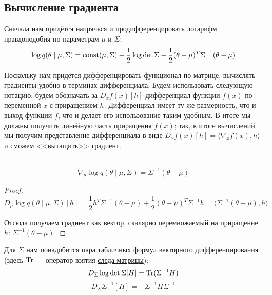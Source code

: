 \subsection{Вычисление градиента}\label{cmaeslikelihoodgrads}

Сначала нам придётся напрячься и продифференцировать логарифм правдоподобия по параметрам $\mu$ и $\Sigma$:
$$\log q(\theta \mid \mu, \Sigma) = \operatorname{const}(\mu, \Sigma) - \frac{1}{2} \log \det \Sigma - \frac{1}{2}(\theta - \mu)^T\Sigma^{-1}(\theta - \mu)$$

Поскольку нам придётся дифференцировать функционал по матрице, вычислять градиенты удобно в терминах дифференциала. Будем использовать следующую нотацию: будем обозначать за $D_x f(x)[h]$ дифференциал функции $f(x)$ по переменной $x$ с приращением $h$. Дифференциал имеет ту же размерность, что и выход функции $f$, что и делает его использование таким удобным. В итоге мы должны получить линейную часть приращения $f(x)$; так, в итоге вычислений мы получим представление дифференциала в виде $D_x f(x)[h] = \langle \nabla_x f(x), h \rangle$ и сможем <<вытащить>> градиент.

\begin{proposition}\,
$$\nabla_\mu \log q(\theta \mid \mu, \Sigma) = \Sigma^{-1}(\theta - \mu)$$
\begin{proof}
$$D_\mu \log q(\theta \mid \mu, \Sigma)[h] = \frac{1}{2}h^T\Sigma^{-1}(\theta - \mu) + \frac{1}{2}(\theta - \mu)^T\Sigma^{-1}h = \langle \Sigma^{-1}(\theta - \mu), h \rangle$$

Отсюда получаем градиент как вектор, скалярно перемножаемый на приращение $h$: $\Sigma^{-1}(\theta - \mu)$.
\end{proof}
\end{proposition}

Для $\Sigma$ нам понадобится пара табличных формул векторного дифференцирования (здесь $\operatorname{Tr}$ --- оператор взятия \href{https://ru.wikipedia.org/wiki/\%D0\%A1\%D0\%BB\%D0\%B5\%D0\%B4_\%D0\%BC\%D0\%B0\%D1\%82\%D1\%80\%D0\%B8\%D1\%86\%D1\%8B}{следа матрицы}):
\begin{equation}\label{logdetdiff}
D_\Sigma \log \det \Sigma [H] = \operatorname{Tr}(\Sigma^{-1}H)
\end{equation}
\begin{equation}\label{inversediff}
D_\Sigma \Sigma^{-1} [H] = -\Sigma^{-1}H\Sigma^{-1}
\end{equation}

